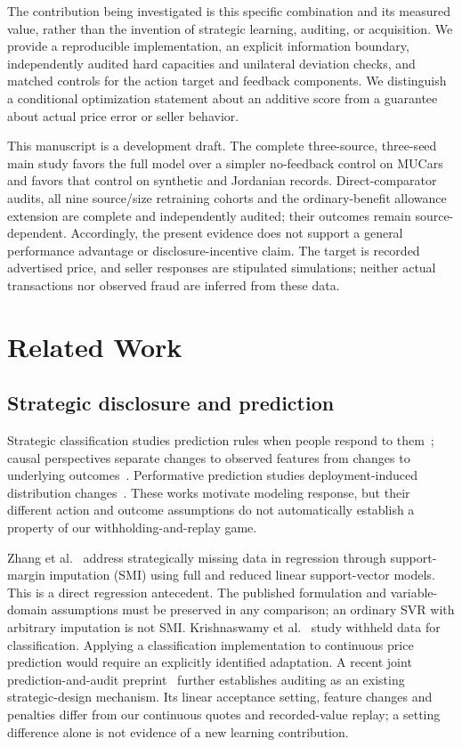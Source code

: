 The contribution being investigated is this specific combination and its
measured value, rather than the invention of strategic learning, auditing,
or acquisition. We provide a reproducible implementation, an explicit
information boundary, independently audited hard capacities and unilateral
deviation checks, and matched controls for the action target and feedback
components. We distinguish a conditional optimization statement about an
additive score from a guarantee about actual price error or seller behavior.

This manuscript is a development draft. The complete three-source,
three-seed main study favors the full model over a simpler no-feedback
control on MUCars and favors that control on synthetic and Jordanian
records. Direct-comparator audits, all nine source/size retraining cohorts
and the ordinary-benefit allowance extension are complete and independently
audited; their outcomes remain source-dependent.
Accordingly, the present evidence
does not support a general performance advantage or disclosure-incentive
claim. The target is recorded advertised price, and seller responses are
stipulated simulations; neither actual transactions nor observed fraud
are inferred from these data.

\section{Related Work}
\subsection{Strategic disclosure and prediction}
Strategic classification studies prediction rules when people respond to
them~\cite{hardt2016strategic,dong2018preferences}; causal perspectives
separate changes to observed features from changes to underlying
outcomes~\cite{miller2020causal}. Performative prediction studies
deployment-induced distribution changes~\cite{perdomo2020performative}.
These works motivate modeling response, but their different action and
outcome assumptions do not automatically establish a property of our
withholding-and-replay game.

Zhang et al.~\cite{zhang2020strategic} address strategically missing data
in regression through support-margin imputation (SMI) using full and
reduced linear support-vector models. This is a direct regression
antecedent. The published formulation and variable-domain assumptions
must be preserved in any comparison; an ordinary SVR with arbitrary
imputation is not SMI. Krishnaswamy et al.~\cite{krishnaswamy2021withheld}
study withheld data for classification. Applying a classification
implementation to continuous price prediction would require an explicitly
identified adaptation. A recent joint prediction-and-audit
preprint~\cite{ebrahimi2026audit} further establishes auditing as an
existing strategic-design mechanism. Its linear acceptance setting,
feature changes and penalties differ from our continuous quotes and
recorded-value replay; a setting difference alone is not evidence of a
new learning contribution.

